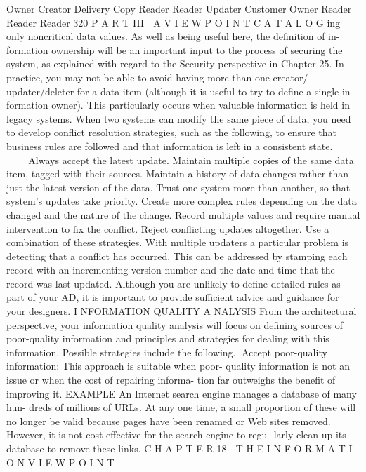  Owner
 Creator
Delivery
 Copy
 Reader
 Reader
 Updater
Customer
 Owner
 Reader
 Reader
 Reader
320
 P A R T III  A V I E W P O I N T C A T A L O G
ing only noncritical data values. As well as being useful here, the definition of in-
formation ownership will be an important input to the process of securing the
system, as explained with regard to the Security perspective in Chapter 25.
In practice, you may not be able to avoid having more than one creator/
updater/deleter for a data item (although it is useful to try to define a single in-
formation owner). This particularly occurs when valuable information is held in
legacy systems. When two systems can modify the same piece of data, you need
to develop conflict resolution strategies, such as the following, to ensure that
business rules are followed and that information is left in a consistent state.
Always accept the latest update.
Maintain multiple copies of the same data item, tagged with their sources.
Maintain a history of data changes rather than just the latest version of
the data.
Trust one system more than another, so that system’s updates take priority.
Create more complex rules depending on the data changed and the nature
of the change.
Record multiple values and require manual intervention to fix the conflict.
Reject conflicting updates altogether.
Use a combination of these strategies.
With multiple updaters a particular problem is detecting that a conflict has
occurred. This can be addressed by stamping each record with an incrementing
version number and the date and time that the record was last updated.
Although you are unlikely to define detailed rules as part of your AD, it is
important to provide sufficient advice and guidance for your designers.
I NFORMATION QUALITY A NALYSIS From the architectural perspective, your
information quality analysis will focus on defining sources of poor-quality
information and principles and strategies for dealing with this information.
Possible strategies include the following.
Accept poor-quality information: This approach is suitable when poor-
quality information is not an issue or when the cost of repairing informa-
tion far outweighs the benefit of improving it.
EXAMPLE An Internet search engine manages a database of many hun-
dreds of millions of URLs. At any one time, a small proportion of these
will no longer be valid because pages have been renamed or Web sites
removed. However, it is not cost-effective for the search engine to regu-
larly clean up its database to remove these links.
C H A P T E R 18  T H E I N F O R M A T I O N V I E W P O I N T
